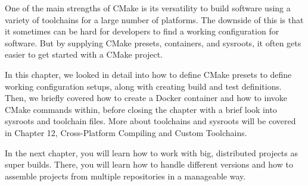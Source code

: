 One of the main strengths of CMake is its versatility to build software using a variety of toolchains for a large number of platforms. The downside of this is that it sometimes can be hard for developers to find a working configuration for software. But by supplying CMake presets, containers, and sysroots, it often gets easier to get started with a CMake project.

In this chapter, we looked in detail into how to define CMake presets to define working configuration setups, along with creating build and test definitions. Then, we briefly covered how to create a Docker container and how to invoke CMake commands within, before closing the chapter with a brief look into sysroots and toolchain files. More about toolchains and sysroots will be covered in Chapter 12, Cross-Platform Compiling and Custom Toolchains.

In the next chapter, you will learn how to work with big, distributed projects as super builds. There, you will learn how to handle different versions and how to assemble projects from multiple repositories in a manageable way.